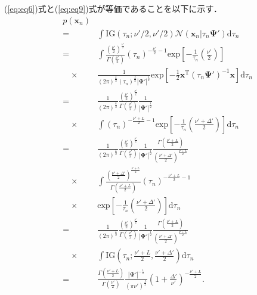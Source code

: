 \documentclass[journal]{IEEEtran}
\begin{document}
(\ref{eq:eq6})式と(\ref{eq:eq9})式が等価であることを以下に示す．
\begin{eqnarray}
	&p(\mathbf{x}_n) \nonumber\\ &=& \int \mathrm{IG}(\tau_n;\nu'/2,\nu'/2) \mathcal{N}(\mathbf{x}_n|\tau_n \mathbf{\Psi}') \mathrm{d}{\tau_n} \nonumber\\
	&=& \int \frac{\left(\frac{\nu'}{2}\right)^{\frac{\nu'}{2}}}{\Gamma \left(\frac{\nu'}{2}\right)} (\tau_n)^{-\frac{\nu'}{2}-1} \mathrm{exp} \left[-\frac{1}{\tau_n} \left(\frac{\nu'}{2} \right) \right] \nonumber\\
	&\quad\times&\frac{1}{(2\pi)^{\frac{L}{2}}(\tau_n)^{\frac{L}{2}}|\mathbf{\Psi'}|^{\frac{1}{2}}} \mathrm{exp} \left[-\frac{1}{2}\mathbf{x}^\mathrm{T} (\tau_n\mathbf{\Psi'})^{-1} \mathbf{x}\right] \mathrm{d}{\tau_n} \nonumber\\
	&=&\frac{1}{(2\pi)^{\frac{L}{2}}}\frac{\left(\frac{\nu'}{2}\right)^{\frac{\nu'}{2}}}{\Gamma \left(\frac{\nu'}{2}\right)}\frac{1}{|\mathbf{\Psi'}|^{\frac{1}{2}}} \nonumber\\
	&\quad\times& \int (\tau_n)^{-\frac{\nu'+L}{2}-1} \mathrm{exp} \left[-\frac{1}{\tau_n} \left(\frac{\nu' + \Delta'}{2}\right) \right] \mathrm{d}{\tau_n} \nonumber\\
	&=&\frac{1}{(2\pi)^{\frac{L}{2}}}\frac{\left(\frac{\nu'}{2}\right)^{\frac{\nu'}{2}}}{\Gamma \left(\frac{\nu'}{2}\right)}\frac{1}{|\mathbf{\Psi'}|^{\frac{1}{2}}} \frac{\Gamma \left(\frac{\nu'+L}{2}\right)}{\left(\frac{\nu'+\Delta'}{2}\right)^{\frac{\nu'+L}{2}}}\nonumber\\
	&\quad\times& \int \frac{\left(\frac{\nu'+\Delta'}{2}\right)^{\frac{\nu'+L}{2}}}{\Gamma \left(\frac{\nu'+L}{2}\right)} (\tau_n)^{-\frac{\nu'+L}{2}-1} \nonumber\\
	&\quad\times& \mathrm{exp} \left[-\frac{1}{\tau_n} \left(\frac{\nu' + \Delta'}{2}\right) \right] \mathrm{d}{\tau_n} \nonumber\\
	&=&\frac{1}{(2\pi)^{\frac{L}{2}}}\frac{\left(\frac{\nu'}{2}\right)^{\frac{\nu'}{2}}}{\Gamma \left(\frac{\nu'}{2}\right)}\frac{1}{|\mathbf{\Psi'}|^{\frac{1}{2}}} \frac{\Gamma \left(\frac{\nu'+L}{2}\right)}{\left(\frac{\nu'+\Delta'}{2}\right)^{\frac{\nu'+L}{2}}}\nonumber\\
	&\quad\times& \int \mathrm{IG}(\tau_n;\frac{\nu'+L}{2},\frac{\nu'+\Delta'}{2}) \mathrm{d}{\tau_n}\nonumber\\
	&=& \frac{\Gamma(\frac{\nu'+L}{2})}{\Gamma(\frac{\nu'}{2})} \frac{|{\bm \Psi'}|^{-\frac{1}{2}}}{\left(\pi \nu' \right)^{\frac{L}{2}}} \left(1+\frac{\Delta '}{\nu '} \right)^{-\frac{\nu'+L}{2}}.
\end{eqnarray}
\end{document}
